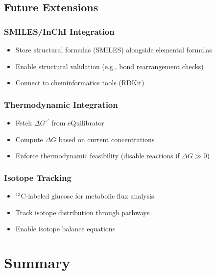 \subsection{Future Extensions}
\label{subsec:future-extensions}

\subsubsection{SMILES/InChI Integration}

\begin{itemize}
    \item Store structural formulas (SMILES) alongside elemental formulas
    \item Enable structural validation (e.g., bond rearrangement checks)
    \item Connect to cheminformatics tools (RDKit)
\end{itemize}

\subsubsection{Thermodynamic Integration}

\begin{itemize}
    \item Fetch $\Delta G^{\circ'}$ from eQuilibrator
    \item Compute $\Delta G$ based on current concentrations
    \item Enforce thermodynamic feasibility (disable reactions if $\Delta G \gg 0$)
\end{itemize}

\subsubsection{Isotope Tracking}

\begin{itemize}
    \item $^{13}$C-labeled glucose for metabolic flux analysis
    \item Track isotope distribution through pathways
    \item Enable isotope balance equations
\end{itemize}

\section{Summary}
\label{sec:chapter6-summary}

